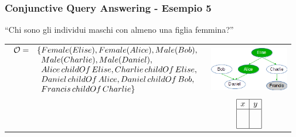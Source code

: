 \documentclass[8pt]{beamer}
\begin{document}
\begin{frame}
\frametitle{Conjunctive Query Answering - Esempio 5}
\begin{center}
``Chi sono gli individui maschi con almeno una figlia femmina?''
\end{center}

\begin{tabular}{lc}
$\begin{array}{cl}
  \Ont  =  &  \{Female(Elise), Female(Alice), Male(Bob), \\
  &\phantom{\{}Male(Charlie), Male(Daniel), \\
  &\phantom{\{}Alice\,childOf\,Elise, Charlie\,childOf\,Elise, \\
  &\phantom{\{}Daniel\,childOf\,Alice, Daniel\,childOf\,Bob, \\
  &\phantom{\{}Francis\,childOf\,Charlie \}\\
\end{array}$ & \includegraphics[width=130px]{family.png} \\
$\phantom{Q=Male(x)\,\wedge\,y\,childOf\,x\,\wedge\,Female(y)}$ &
$\begin{array}{|c|c|}
  \hline
  x&y\\
  \hline
  &\\
  &\\
  \hline
\end{array}$\\
\end{tabular}
\end{frame}
\end{document}
